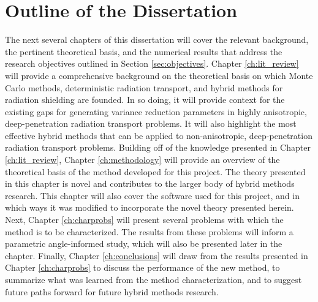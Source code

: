 \section{Outline of the Dissertation}
\label{sec:outline}

The next several chapters of this dissertation will cover the relevant
background, the pertinent theoretical basis, and the numerical results that
address the research objectives outlined in Section \ref{sec:objectives}.
Chapter \ref{ch:lit_review} will provide a
comprehensive background on the theoretical basis on which Monte Carlo methods,
deterministic radiation transport, and hybrid methods for radiation shielding
are founded. In so doing, it will provide context for the existing gaps for
generating variance reduction parameters in
highly anisotropic, deep-penetration radiation transport problems. It will also
highlight the most effective hybrid methods that can be applied to
non-anisotropic, deep-penetration radiation transport problems. Building off of
the knowledge presented in Chapter \ref{ch:lit_review},
Chapter \ref{ch:methodology} will provide an overview of the
theoretical basis of the method developed for this project. The theory
presented in this chapter is novel and contributes to the larger body of hybrid
methods research. This chapter will also cover the software used for this
project, and in which ways it was modified to incorporate the novel theory
presented herein. Next, Chapter \ref{ch:charprobs} will present several problems
with which the method is to be characterized. The results from these problems
will inform a parametric angle-informed study, which will also be presented
later in the chapter. Finally, Chapter \ref{ch:conclusions} will draw from the
results presented in Chapter \ref{ch:charprobs} to discuss the performance of
the new method, to summarize what was learned from the method characterization,
and to suggest future paths forward for future hybrid methods research.



